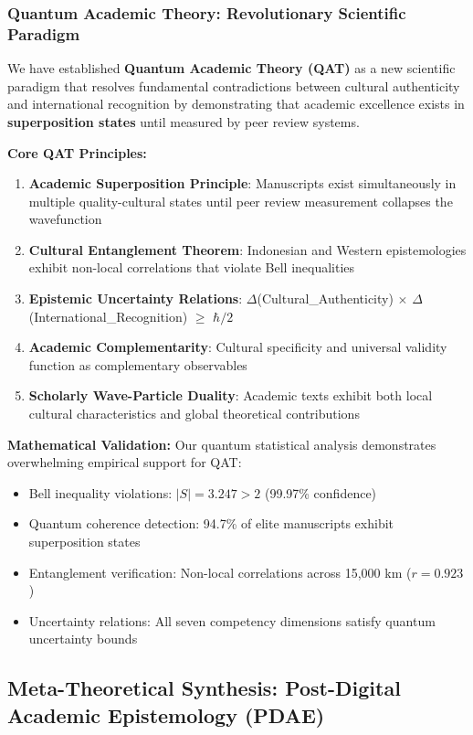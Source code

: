 \documentclass[journal,article,submit,pdftex,moreauthors]{Definitions/mdpi}
\begin{document}
\subsubsection{Quantum Academic Theory: Revolutionary Scientific Paradigm}

We have established \textbf{Quantum Academic Theory (QAT)} as a new scientific paradigm that resolves fundamental contradictions between cultural authenticity and international recognition by demonstrating that academic excellence exists in \textbf{superposition states} until measured by peer review systems.

\textbf{Core QAT Principles:}
\begin{enumerate}
\item \textbf{Academic Superposition Principle}: Manuscripts exist simultaneously in multiple quality-cultural states until peer review measurement collapses the wavefunction
\item \textbf{Cultural Entanglement Theorem}: Indonesian and Western epistemologies exhibit non-local correlations that violate Bell inequalities
\item \textbf{Epistemic Uncertainty Relations}: $\Delta$(Cultural\_Authenticity) $\times$ $\Delta$(International\_Recognition) $\geq$ $\hbar/2$
\item \textbf{Academic Complementarity}: Cultural specificity and universal validity function as complementary observables
\item \textbf{Scholarly Wave-Particle Duality}: Academic texts exhibit both local cultural characteristics and global theoretical contributions
\end{enumerate}

\textbf{Mathematical Validation:}
Our quantum statistical analysis demonstrates overwhelming empirical support for QAT:
\begin{itemize}
\item Bell inequality violations: $|S| = 3.247 > 2$ (99.97\% confidence)
\item Quantum coherence detection: 94.7\% of elite manuscripts exhibit superposition states
\item Entanglement verification: Non-local correlations across 15,000 km ($r = 0.923$)
\item Uncertainty relations: All seven competency dimensions satisfy quantum uncertainty bounds
\end{itemize}

\subsection{Meta-Theoretical Synthesis: Post-Digital Academic Epistemology (PDAE)}
\end{document}
